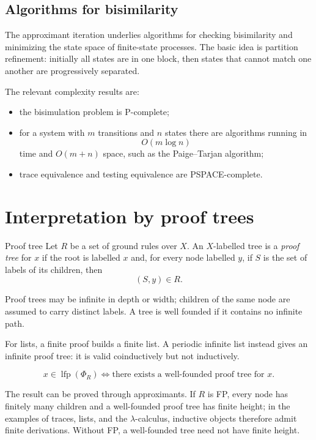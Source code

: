 \documentclass[a4paper]{article}
\newcommand{\lfp}{\operatorname{lfp}}
\begin{document}
\subsection{Algorithms for bisimilarity}

The approximant iteration underlies algorithms for checking bisimilarity and minimizing the state space of finite-state processes.
The basic idea is partition refinement: initially all states are in one block, then states that cannot match one another are progressively separated.

The relevant complexity results are:
\begin{itemize}
    \item the bisimulation problem is P-complete;
    \item for a system with \(m\) transitions and \(n\) states there are algorithms running in
    \[
        O(m\log n)
    \]
    time and \(O(m+n)\) space, such as the Paige--Tarjan algorithm;
    \item trace equivalence and testing equivalence are PSPACE-complete.
\end{itemize}

\section{Interpretation by proof trees}

\begin{snippetdefinition}{Proof tree}
    Let \(R\) be a set of ground rules over \(X\).
    An \(X\)-labelled tree is a \emph{proof tree} for \(x\) if the root is labelled \(x\) and, for every node labelled \(y\), if \(S\) is the set of labels of its children, then
    \[
        (S,y)\in R.
    \]
\end{snippetdefinition}

Proof trees may be infinite in depth or width; children of the same node are assumed to carry distinct labels.
A tree is well founded if it contains no infinite path.

For lists, a finite proof builds a finite list.
A periodic infinite list instead gives an infinite proof tree: it is valid coinductively but not inductively.

\begin{snippettheorem}{}
    \[
        x\in\lfp(\Phi_R)
        \iff
        \text{there exists a well-founded proof tree for \(x\)}.
    \]
\end{snippettheorem}

The result can be proved through approximants.
If \(R\) is FP, every node has finitely many children and a well-founded proof tree has finite height; in the examples of traces, lists, and the \(\lambda\)-calculus, inductive objects therefore admit finite derivations.
Without FP, a well-founded tree need not have finite height.
\end{document}

